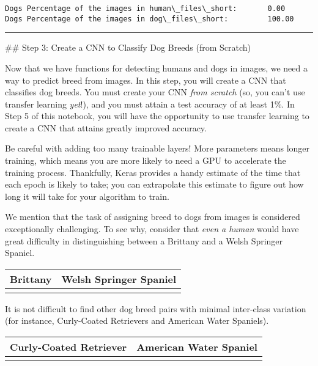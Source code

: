 \documentclass[11pt]{article}
\begin{document}
    \begin{Verbatim}[commandchars=\\\{\}]
Dogs Percentage of the images in human\_files\_short: 		0.00 
Dogs Percentage of the images in dog\_files\_short: 		100.00 

    \end{Verbatim}

    \begin{center}\rule{0.5\linewidth}{\linethickness}\end{center}

 \#\# Step 3: Create a CNN to Classify Dog Breeds (from Scratch)

Now that we have functions for detecting humans and dogs in images, we
need a way to predict breed from images. In this step, you will create a
CNN that classifies dog breeds. You must create your CNN \emph{from
scratch} (so, you can't use transfer learning \emph{yet}!), and you must
attain a test accuracy of at least 1\%. In Step 5 of this notebook, you
will have the opportunity to use transfer learning to create a CNN that
attains greatly improved accuracy.

Be careful with adding too many trainable layers! More parameters means
longer training, which means you are more likely to need a GPU to
accelerate the training process. Thankfully, Keras provides a handy
estimate of the time that each epoch is likely to take; you can
extrapolate this estimate to figure out how long it will take for your
algorithm to train.

We mention that the task of assigning breed to dogs from images is
considered exceptionally challenging. To see why, consider that
\emph{even a human} would have great difficulty in distinguishing
between a Brittany and a Welsh Springer Spaniel.

\begin{longtable}[]{@{}ll@{}}
\toprule
Brittany & Welsh Springer Spaniel\tabularnewline
\midrule
\endhead
&\tabularnewline
\bottomrule
\end{longtable}

It is not difficult to find other dog breed pairs with minimal
inter-class variation (for instance, Curly-Coated Retrievers and
American Water Spaniels).

\begin{longtable}[]{@{}ll@{}}
\toprule
Curly-Coated Retriever & American Water Spaniel\tabularnewline
\midrule
\endhead
&\tabularnewline
\bottomrule
\end{longtable}
\end{document}
